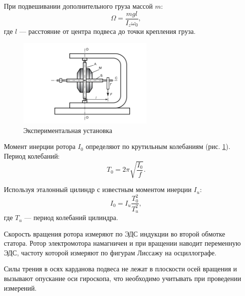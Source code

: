 \documentclass[a4paper, 12pt]{article}
\begin{document}
При подвешивании дополнительного груза массой $m$:
\begin{equation}
\Omega = \frac{mgl}{I_z\omega_0},
\end{equation}
где $l$ — расстояние от центра подвеса до точки крепления груза.

\begin{figure}[h]
\centering
\includegraphics[width=0.6\textwidth]{рис3.png}
\caption{Экспериментальная установка}
\label{fig3}
\end{figure}

Момент инерции ротора $I_0$ определяют по крутильным колебаниям (рис. \ref{fig3}). Период колебаний:
\begin{equation}
T_0 = 2\pi\sqrt{\frac{I_0}{f}}.
\end{equation}

Используя эталонный цилиндр с известным моментом инерции $I_u$:
\begin{equation}
I_0 = I_u\frac{T_0^2}{T_u^2},
\end{equation}
где $T_u$ — период колебаний цилиндра.

Скорость вращения ротора измеряют по ЭДС индукции во второй обмотке статора. Ротор электромотора намагничен и при вращении наводит переменную ЭДС, частоту которой измеряют по фигурам Лиссажу на осциллографе.

Силы трения в осях карданова подвеса не лежат в плоскости осей вращения и вызывают опускание оси гироскопа, что необходимо учитывать при проведении измерений.
\end{document}
